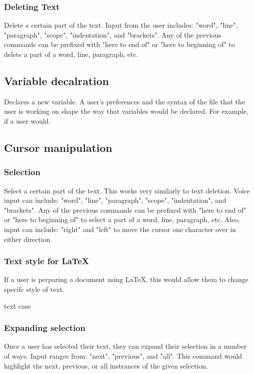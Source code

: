 \documentclass[11pt, oneside]{article}
\begin{document}
	\subsubsection{Deleting Text}
	Delete a certain part of the text. Input from the user includes: "word", "line", "paragraph", "scope", "indentation", and "brackets". Any of the previous commands can be prefixed with "here to end of" or "here to beginning of" to delete a part of a word, line, paragraph, etc.

	\subsection{Variable decalration}
	Declares a new variable. A user's preferences and the syntax of the file that the user is working on shape the way that variables would be declared. For example, if a user would.

\subsection{Cursor manipulation}


	\subsubsection{Selection}
	Select a certain part of the text. This works very similarly to text deletion. Voice input can include: "word", "line", "paragraph", "scope", "indentation", and "brackets". Any of the previous commands can be prefixed with "here to end of" or "here to beginning of" to select a part of a word, line, paragraph, etc. Also, input can include: "right" and "left" to move the cursor one character over in either direction.

	\subsubsection{Text style for \LaTeX}
	If a user is perparing a document using \LaTeX, this would allow them to change specifc style of text.

	text case

	\subsubsection{Expanding selection}
	Once a user has selected their text, they can expand their selection in a number of ways. Input ranges from: "next", "previous", and "all". This command would highlight the next, previous, or all instrances of the given selection.
\end{document}

